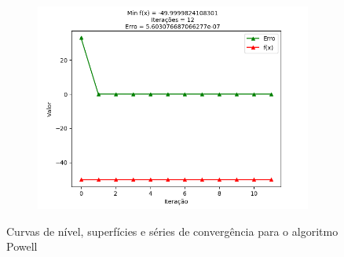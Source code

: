 \documentclass[a4paper, 12pt]{article}
\begin{document}
\begin{figure}[H]
\begin{subfigure}{0.3\textwidth}
  \includegraphics[width=\linewidth]{5/MPFE/A/Powell/convergencia.png}
\end{subfigure}
\caption{Curvas de nível, superfícies e séries de convergência para o algoritmo Powell}
\label{fig:Q5APowell}
\end{figure}
\end{document}
